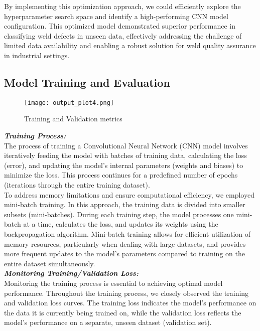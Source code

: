 \documentclass{article_saj}
\begin{document}
\indent By implementing this optimization approach, we could efficiently explore the hyperparameter search space and identify a high-performing CNN model configuration. This optimized model demonstrated superior performance in classifying weld defects in unseen data, effectively addressing the challenge of limited data availability and enabling a robust solution for weld quality assurance in industrial settings.

\subsection{Model Training and Evaluation}
\indent
\begin{figure}
    \centering
    \texttt{[image: output\_plot4.png]}
    \caption{Training and Validation metrics}
    \label{fig:training_validation}
\end{figure}
\indent \textbf{\textit{Training Process:}}\\
The process of training a Convolutional Neural Network (CNN) model involves iteratively feeding the model with batches of training data, calculating the loss (error), and updating the model's internal parameters (weights and biases) to minimize the loss. This process continues for a predefined number of epochs (iterations through the entire training dataset).\\

\indent To address memory limitations and ensure computational efficiency, we employed mini-batch training. In this approach, the training data is divided into smaller subsets (mini-batches). During each training step, the model processes one mini-batch at a time, calculates the loss, and updates its weights using the backpropagation algorithm. Mini-batch training allows for efficient utilization of memory resources, particularly when dealing with large datasets, and provides more frequent updates to the model's parameters compared to training on the entire dataset simultaneously.\\

\indent \textbf{\textit{Monitoring Training/Validation Loss:}}\\
Monitoring the training process is essential to achieving optimal model performance. Throughout the training process, we closely observed the training and validation loss curves. The training loss indicates the model's performance on the data it is currently being trained on, while the validation loss reflects the model's performance on a separate, unseen dataset (validation set).\\
\end{document}
